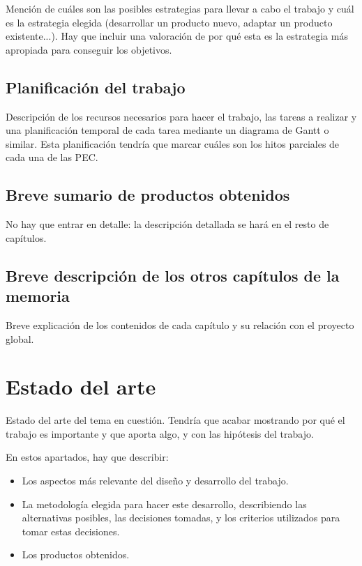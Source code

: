 \documentclass[IB,BIB]{TFUOC}%
\begin{document}
Mención de cuáles son las posibles estrategias para llevar a cabo el trabajo y cuál es la estrategia elegida (desarrollar un producto nuevo, adaptar un producto existente...). Hay que incluir una valoración de por qué esta es la estrategia más apropiada para conseguir los objetivos.   	



\section{Planificación del trabajo}

Descripción de los recursos necesarios para hacer el trabajo, las tareas a realizar y una planificación temporal de cada tarea mediante un diagrama de Gantt o similar. Esta planificación tendría que marcar cuáles son los hitos parciales de cada una de las PEC.



\section{Breve sumario de productos obtenidos}

No hay que entrar en detalle: la descripción detallada se hará en el resto de capítulos.


\section{Breve descripción de los otros capítulos de la memoria}

Breve explicación de los contenidos de cada capítulo y su relación con el proyecto global.

\chapter{Estado del arte}

Estado del arte del tema en cuestión.
Tendría que acabar mostrando por qué el trabajo es importante y que aporta algo, y con las hipótesis del trabajo.


En estos apartados, hay que describir:
\begin{itemize}
    \item Los aspectos más relevante del diseño y desarrollo del trabajo.
    \item La metodología elegida para hacer este desarrollo, describiendo las alternativas posibles, las decisiones tomadas, y los criterios utilizados para tomar estas decisiones.
    \item Los productos obtenidos.
\end{itemize}
\end{document}
